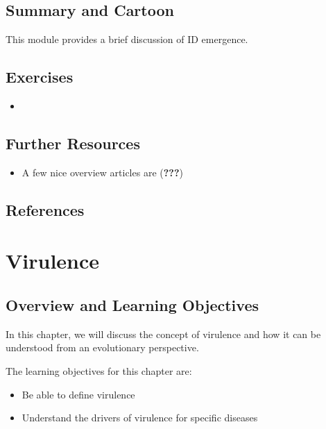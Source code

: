 \documentclass[
]{book}
\providecommand{\tightlist}{%
  \setlength{\itemsep}{0pt}\setlength{\parskip}{0pt}}
\begin{document}
\hypertarget{summary-and-cartoon-15}{%
\section{Summary and Cartoon}\label{summary-and-cartoon-15}}

This module provides a brief discussion of ID emergence.

\hypertarget{exercises-15}{%
\section{Exercises}\label{exercises-15}}

\begin{itemize}
\item
\end{itemize}

\hypertarget{further-resources-15}{%
\section{Further Resources}\label{further-resources-15}}

\begin{itemize}
\tightlist
\item
  A few nice overview articles are ({\textbf{???}})
\end{itemize}

\hypertarget{references-16}{%
\section{References}\label{references-16}}

\hypertarget{virulence}{%
\chapter{Virulence}\label{virulence}}

\hypertarget{overview-and-learning-objectives-16}{%
\section{Overview and Learning Objectives}\label{overview-and-learning-objectives-16}}

In this chapter, we will discuss the concept of virulence and how it can be understood from an evolutionary perspective.

The learning objectives for this chapter are:

\begin{itemize}
\tightlist
\item
  Be able to define virulence
\item
  Understand the drivers of virulence for specific diseases
\end{itemize}
\end{document}
